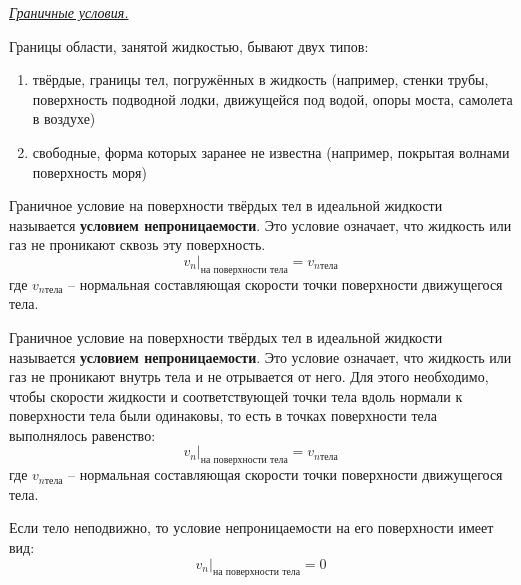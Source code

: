 \begin{center} \textit{\underline{Граничные условия.}} \end{center}

Границы области, занятой жидкостью, бывают двух типов:
\begin{enumerate}
\item твёрдые, границы тел, погружённых в жидкость (например, стенки трубы, поверхность подводной лодки, движущейся под водой, опоры моста, самолета в воздухе)
\item свободные, форма которых заранее не известна (например, покрытая волнами поверхность моря)
\end{enumerate}

\begin{defn}[Э-128] Граничное условие на поверхности твёрдых тел в идеальной жидкости называется \textbf{условием непроницаемости}. Это условие означает, что жидкость или газ не проникают сквозь эту поверхность.
$$ \left. v_n \right|_{\text{на поверхности тела}} = v_{n тела}$$
где $ v_{n тела} $ -- нормальная составляющая скорости точки поверхности движущегося тела.
\end{defn}


\begin{defn}[Э-128] Граничное условие на поверхности твёрдых тел в идеальной жидкости называется \textbf{условием непроницаемости}. Это условие означает, что жидкость или газ не проникают внутрь тела и не отрывается от него.
Для этого необходимо, чтобы скорости жидкости и соответствующей точки тела вдоль нормали к поверхности тела были одинаковы, то есть в точках поверхности тела выполнялось равенство:
$$ \left. v_n \right|_{\text{на поверхности тела}} = v_{n тела}$$
где $ v_{n тела} $ -- нормальная составляющая скорости точки поверхности движущегося тела.
\end{defn}

Если тело неподвижно, то условие непроницаемости на его поверхности имеет вид:
$$ \left. v_n \right|_{\text{на поверхности тела}} = 0 $$